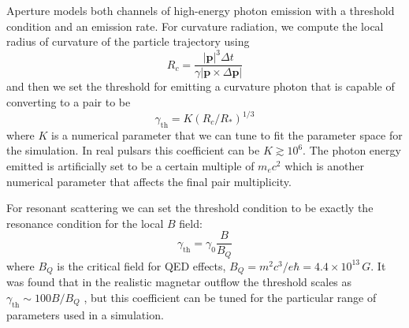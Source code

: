 
Aperture models both channels of high-energy photon emission with a threshold
condition and an emission rate. For curvature radiation, we compute the local
radius of curvature of the particle trajectory using
\begin{equation}
  \label{eq:curvature-radius}
  R_{c} = \frac{|\mathbf{p}|^3\Delta t}{\gamma \left| \mathbf{p} \times \Delta \mathbf{p} \right|}
\end{equation}
and then we set the threshold for emitting a curvature photon that is capable of
converting to a pair to be
\begin{equation}
  \label{eq:curvature-threshold}
  \gamma_\mathrm{th} = K(R_{c}/R_{*})^{1/3}
\end{equation}
where $K$ is a numerical parameter that we can tune to fit the parameter space
for the simulation. In real pulsars this coefficient can be $K\gtrsim 10^{6}$.
The photon energy emitted is artificially set to be a certain multiple of
$m_{e}c^2$ which is another numerical parameter that affects the final pair
multiplicity.

For resonant scattering we can set the threshold condition to be exactly the
resonance condition for the local $B$ field:
\begin{equation}
  \label{eq:resonant-threshold}
  \gamma_\mathrm{th} = \gamma_0\frac{B}{B_Q}
\end{equation}
where $B_Q$ is the critical field for QED effects, $B_Q = m^2c^3/e\hbar =
4.4\times 10^{13}\,G$. It was found that in the realistic magnetar outflow the
threshold scales as $\gamma_\mathrm{th} \sim 100 B/B_{Q}$
\citep{beloborodov_mechanism_2013}, but this coefficient can be tuned for the
particular range of parameters used in a simulation.

